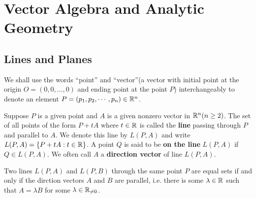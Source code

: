     \chapter{Vector Algebra and Analytic Geometry}
    \section{Lines and Planes}
    \begin{remarkenv}
        We shall use the words ``point'' and ``vector''(a vector with initial point at the origin $O=(0,0,\ldots,0)$ and ending point at the point $P$) interchangeably to denote an element $P = (p_1, p_2, \cdots, p_n) \in \mathbb{R}^n$.
    \end{remarkenv}
    \begin{definitionenv}
        Suppose $P$ is a given point and $A$ is a given nonzero vector in $\mathbb{R}^n(n\ge 2)$. The set of all points of the form $P+tA$ where $t\in \mathbb{R}$ is called the \textbf{line} passing through $P$ and parallel to $A$. We denote this line by $L(P,A)$ and write $L(P,A) = \{ P+tA : t\in \mathbb{R}\}$. A point $Q$ is said to be \textbf{on the line} $L(P,A)$ if $Q\in L(P,A)$. We often call $A$ a \textbf{direction vector} of line $L(P,A)$.
    \end{definitionenv}
    \begin{theoremenv}
        Two lines $L(P,A)$ and $L(P,B)$ through the same point $P$ are equal sets if and only if the dirction vectors $A$ and $B$ are parallel, i.e. there is some $\lambda \in \mathbb{R}$ such that $A = \lambda B$ for some $\lambda \in \mathbb{R}_{\neq 0}$.
    \end{theoremenv}

